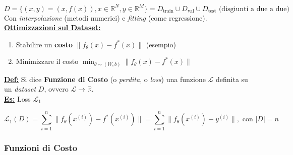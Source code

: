\documentclass[a4paper,12pt]{article}
\newcommand{\definizione}{\noindent\textbf{\underline{Def:}} }
\newcommand{\esempio}{\noindent\textbf{\underline{Es:}} }
\begin{document}
	$
	D = \{ (x,y) = (x, f(x)), x \in \mathbb{R}^N, y \in \mathbb{R}^M \} = D_{\text{train}} \cup D_{\text{val}} \cup D_{\text{test}} \text{ (disgiunti a due a due)}
	$ \\

	Con \textit{interpolazione} (metodi numerici) e \textit{fitting} (come regressione). \\

	\textbf{\underline{Ottimizzazioni sul Dataset:}}

	\begin{enumerate}
		\item Stabilire un \textbf{costo} $ \| f_\theta (x) - f^*(x)\|$ (esempio)
		\item Minimizzare il costo $\min_{\theta \sim (W,b)}  \| f_\theta (x) - f^*(x)\| $
	\end{enumerate}


	\definizione Si dice \textbf{Funzione di Costo} (o \textit{perdita}, o \textit{loss}) una funzione $ \mathcal{L}$ definita su un \textit{dataset} $D$, ovvero $\mathcal{L} \rightarrow \mathbb{R}$. \\

	\esempio Loss $\mathcal{L}_1$

	\[
	\mathcal{L}_1 (D) = \sum_{i = 1}^{n} \| f_\theta (x^{(i)}) - f^* (x^{(i)}) \| = \sum_{i = 1}^{n} \| f_\theta (x^{(i)}) - y^{(i)} \|, \text{ con } |D| = n
	\]

	\subsubsection{Funzioni di Costo}
\end{document}
